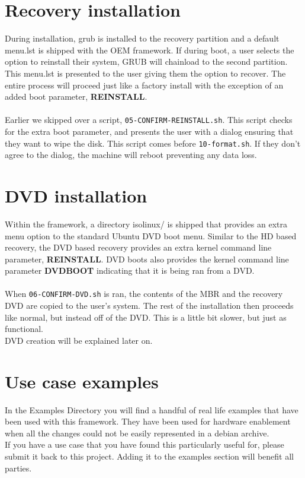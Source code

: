 \documentclass[letterpaper,10pt,titlepage]{article}
\begin{document}
\section{Recovery installation}
During installation, grub is installed to the recovery partition and a default menu.lst is shipped with the OEM framework.   If during boot, a user selects the option to reinstall their system, GRUB will chainload to the second partition.  This menu.lst is presented to the user giving them the option to recover.  The entire process will proceed just like a factory install with the exception of an added boot parameter, \textbf{REINSTALL}.
\\
\\
Earlier we skipped over a script, \texttt{05-CONFIRM-REINSTALL.sh}.  This script checks for the extra boot parameter, and presents the user with a dialog ensuring that they want to wipe the disk.  This script comes before \texttt{10-format.sh}.  If they don't agree to the dialog, the machine will reboot preventing any data loss.

\section{DVD installation}
Within the framework, a directory isolinux/ is shipped that provides an extra menu option to the standard Ubuntu DVD boot menu.
Similar to the HD based recovery, the DVD based recovery provides an extra kernel command line parameter, \textbf{REINSTALL}.
DVD boots also provides the kernel command line parameter \textbf{DVDBOOT} indicating that it is being ran from a DVD.
\\
\\
When \texttt{06-CONFIRM-DVD.sh} is ran, the contents of the MBR and the recovery DVD are copied to the user's system.  The rest of the installation then proceeds like normal, but instead off of the DVD.  This is a little bit slower, but just as functional.
\\
DVD creation will be explained later on.


\section{Use case examples}
In the Examples Directory you will find a handful of real life examples that have been used with this framework.  They have been used for hardware enablement when all the changes could not be easily represented in a debian archive.
\\
If you have a use case that you have found this particularly useful for, please submit it back to this project.  Adding it to the examples section will benefit all parties.
\end{document}
